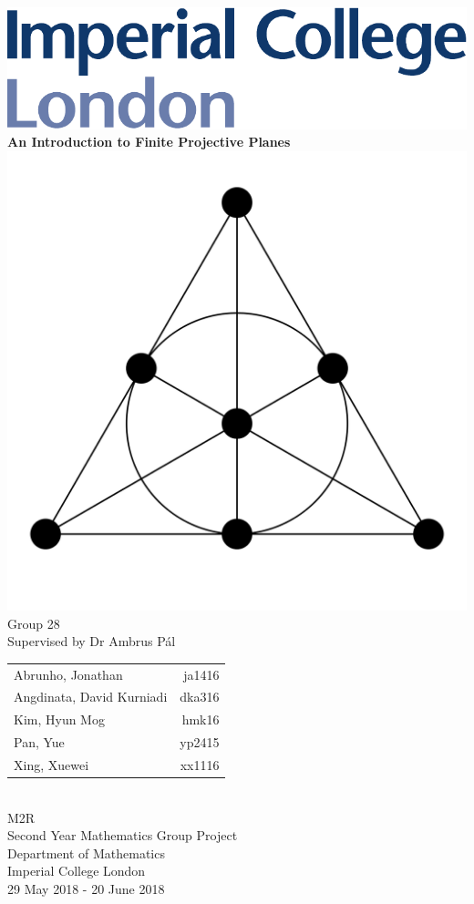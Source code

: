 \documentclass{report}
\theoremstyle{definition}\newtheorem*{definition}{Definition}
\theoremstyle{definition}\newtheorem*{example}{Example}
\theoremstyle{remark}\newtheorem*{remark}{Remark}
\begin{document}
\begin{titlepage}
\begin{center}
\vspace{1cm}
\includegraphics[scale=0.2]{imperial.pdf} \\
\vspace{1cm}
\textbf{\Large An Introduction to Finite Projective Planes} \\
\vspace{2cm}
\includegraphics[scale=0.2]{order_2.jpg}
\vfill
Group 28 \\
\vspace{1cm}
Supervised by Dr Ambrus Pál \\
\vspace{1cm}
\begin{tabular}{lr}
Abrunho, Jonathan & ja1416 \\
Angdinata, David Kurniadi & dka316 \\
Kim, Hyun Mog & hmk16 \\
Pan, Yue & yp2415 \\
Xing, Xuewei & xx1116 \\
\end{tabular}
\vspace{1cm} \\
M2R \\
Second Year Mathematics Group Project \\
Department of Mathematics \\
Imperial College London \\
29 May 2018 - 20 June 2018
\end{center}
\end{titlepage}
\end{document}
